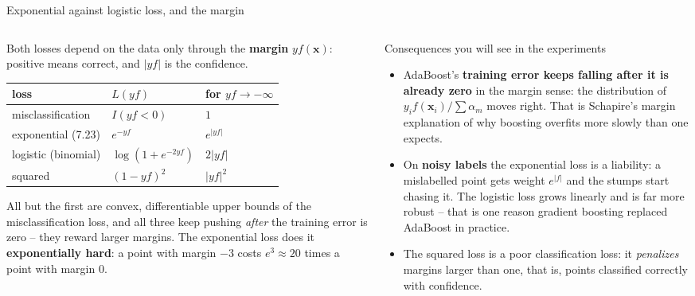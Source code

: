 \documentclass[10pt,aspectratio=169]{beamer}
\begin{document}
\begin{frame}{Exponential against logistic loss, and the margin}
\begin{columns}[T]
\begin{column}{0.5\textwidth}
\footnotesize
Both losses depend on the data only through the \textbf{margin}
$y f(\bm{x})$: positive means correct, and $|yf|$ is the confidence.
\begin{center}
\begin{tabular}{@{}lll@{}}
\toprule
loss & $L(yf)$ & for $yf\to-\infty$\\
\midrule
misclassification & $I(yf<0)$ & $1$\\
exponential (7.23) & $e^{-yf}$ & $e^{|yf|}$\\
logistic (binomial) & $\log(1+e^{-2yf})$ & $2|yf|$\\
squared & $(1-yf)^2$ & $|yf|^2$\\
\bottomrule
\end{tabular}
\end{center}
All but the first are convex, differentiable upper bounds of the
misclassification loss, and all three keep pushing \emph{after} the training
error is zero -- they reward larger margins.  The exponential loss does it
\textbf{exponentially hard}: a point with margin $-3$ costs $e^3\approx20$
times a point with margin $0$.
\end{column}
\begin{column}{0.5\textwidth}
\begin{block}{Consequences you will see in the experiments}
\footnotesize
\begin{itemize}
  \item AdaBoost's \textbf{training error keeps falling after it is already
    zero} in the margin sense: the distribution of $y_if(\bm{x}_i)/\sum\alpha_m$
    moves right.  That is Schapire's margin explanation of why boosting
    overfits more slowly than one expects.
  \item On \textbf{noisy labels} the exponential loss is a liability: a
    mislabelled point gets weight $e^{|f|}$ and the stumps start chasing it.
    The logistic loss grows linearly and is far more robust -- that is one
    reason gradient boosting replaced AdaBoost in practice.
  \item The squared loss is a poor classification loss: it \emph{penalizes}
    margins larger than one, that is, points classified correctly with
    confidence.
\end{itemize}
\end{block}
\end{column}
\end{columns}
\end{frame}
\end{document}
